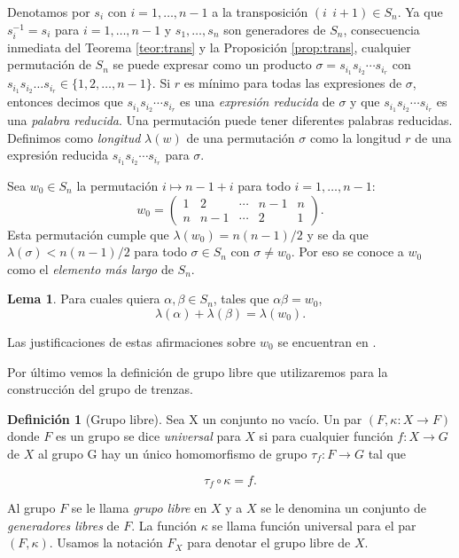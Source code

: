 \documentclass[12pt]{article}
\theoremstyle{definition}
\newtheorem{defi}{Definición}[section]
\newtheorem{lema}{Lema}[section]
\begin{document}
Denotamos por $s_i$ con $i=1,\ldots,n-1$ a la transposición $(i\ \ i+1)\in S_n$. Ya que $s_i^{-1}= s_i$ para $i=1,\ldots,n-1$ y $s_1,\ldots,s_n$ son generadores de $S_n$, consecuencia inmediata del Teorema \ref{teor:trans} y la Proposición \ref{prop:trans}, cualquier permutación de $S_n$ se puede expresar como un producto $\sigma = s_{i_1}s_{i_2}\cdots s_{i_r}$ con $s_{i_1}s_{i_2}\ldots s_{i_r}\in\{1,2,\ldots,n-1\}$. Si $r$ es mínimo para todas las expresiones de $\sigma$, entonces decimos que $s_{i_1}s_{i_2}\cdots s_{i_r}$ es una \textit{expresión reducida} de $\sigma$ y que $s_{i_1}s_{i_2}\cdots s_{i_r}$ es una \textit{palabra reducida}. Una permutación puede tener diferentes palabras reducidas. Definimos como \textit{longitud} $\lambda(w)$ de una permutación $\sigma$ como la longitud $r$ de una expresión reducida $s_{i_1}s_{i_2}\cdots s_{i_r}$ para $\sigma$.

Sea $w_0\in S_n$ la permutación $i\mapsto n-1+i$ para todo $i = 1,\ldots,n-1$:
$$w_0 = 
\begin{pmatrix} 
1 & 2 & \cdots & n-1 & n \\
n & n-1 & \cdots & 2 & 1
\end{pmatrix}
.$$
Esta permutación cumple que $\lambda(w_0)=n(n-1)/2$ y se da que $\lambda(\sigma)<n(n-1)/2$ para todo $\sigma\in S_n$ con $\sigma\neq w_0$. Por eso se conoce a $w_0$ como el \textit{elemento más largo} de $S_n$.

\begin{lema}
Para cuales quiera $\alpha,\beta\in S_n$, tales que $\alpha\beta = w_0$,
$$\lambda(\alpha)+\lambda(\beta)=\lambda(w_0).$$
\label{lema:long_per}
\end{lema}

Las justificaciones de estas afirmaciones sobre $w_0$ se encuentran en \cite{br_gr}.

Por último vemos la definición de grupo libre que utilizaremos para la construcción del grupo de trenzas.

\begin{defi}[Grupo libre]
Sea X un conjunto no vacío. Un par $(F,\kappa:X\rightarrow F)$ donde $F$ es un grupo se dice \textit{universal} para $X$ si para cualquier función $f:X\rightarrow G$ de $X$ al grupo G hay un único homomorfismo de grupo $\tau_f:F\rightarrow G$ tal que

$$\tau_f\circ\kappa = f.$$

Al grupo $F$ se le llama \textit{grupo libre} en $X$ y a $X$ se le denomina un conjunto de \textit{generadores libres} de $F$. La función $\kappa$ se llama función universal para el par $(F,\kappa)$. Usamos la notación $F_X$ para denotar el grupo libre de $X$.

\end{defi}
\end{document}
